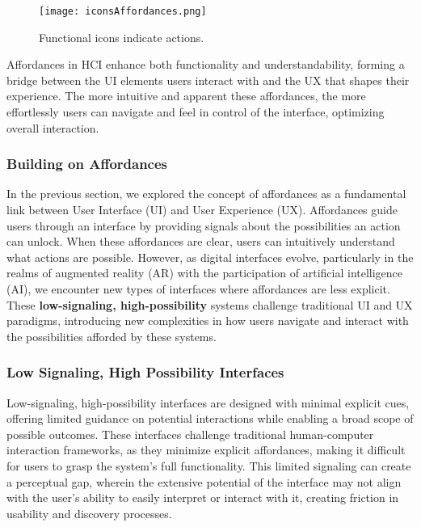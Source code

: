 \begin{figure}[!h]
    \centering
    \texttt{[image: iconsAffordances.png]}
    \caption{Functional icons indicate actions.}
    \vspace{0.1cm}
    \label{fig:affordances}
\end{figure}

Affordances in HCI enhance both functionality and understandability, forming a bridge between the UI elements users interact with and the UX that shapes their experience.
The more intuitive and apparent these affordances, the more effortlessly users can navigate and feel in control of the interface, optimizing overall interaction.

\subsubsection{Building on Affordances}

In the previous section, we explored the concept of affordances as a fundamental link between User Interface (UI) and User Experience (UX).
Affordances guide users through an interface by providing signals about the possibilities an action can unlock\cite{10.20380/gi2000.24}\cite{10.1177/1086026618803729}.
When these affordances are clear, users can intuitively understand what actions are possible.
However, as digital interfaces evolve, particularly in the realms of augmented reality (AR) with the participation of artificial intelligence (AI), we encounter new types of interfaces where affordances are less explicit.
These \textbf{low-signaling, high-possibility} systems challenge traditional UI and UX paradigms, introducing new complexities in how users navigate and interact with the possibilities afforded by these systems.

\subsubsection{ Low Signaling, High Possibility Interfaces}

Low-signaling, high-possibility interfaces are designed with minimal explicit cues, offering limited guidance on potential interactions while enabling a broad scope of possible outcomes.
These interfaces challenge traditional human-computer interaction frameworks, as they minimize explicit affordances, making it difficult for users to grasp the system's full functionality.
This limited signaling can create a perceptual gap, wherein the extensive potential of the interface may not align with the user's ability to easily interpret or interact with it, creating friction in usability and discovery processes.

